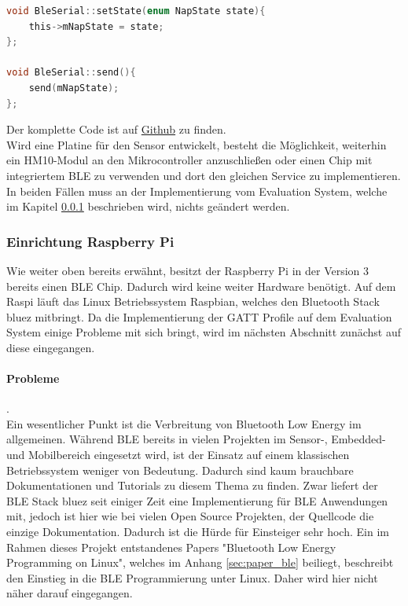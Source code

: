 \begin{lstlisting}[language=C, caption=send und setState Methoden aus der BleSerial bibliothek, label=lst:bleSerial_methods ]
void BleSerial::setState(enum NapState state){
	this->mNapState = state;
};

void BleSerial::send(){
	send(mNapState);
};
\end{lstlisting}

Der komplette Code ist auf \href{https://github.com/jomaway/poop-face-detection_sensor/tree/master/arduino/libraries/BleSerial}{Github}  zu finden. \\

Wird eine Platine für den Sensor entwickelt, besteht die Möglichkeit, weiterhin ein HM10-Modul an den Mikrocontroller anzuschließen oder einen Chip mit integriertem BLE zu verwenden und dort den gleichen Service zu implementieren. In beiden Fällen muss an der Implementierung vom Evaluation System, welche im Kapitel \ref{subsubsec:ble_raspi} beschrieben wird, nichts geändert werden.

\subsubsection{Einrichtung Raspberry Pi}
\label{subsubsec:ble_raspi}
Wie weiter oben bereits erwähnt, besitzt der Raspberry Pi in der Version 3 bereits einen BLE Chip. Dadurch wird keine weiter Hardware benötigt. Auf dem Raspi läuft das Linux Betriebssystem Raspbian, welches den Bluetooth Stack bluez mitbringt. Da die Implementierung der GATT Profile auf dem Evaluation System einige Probleme mit sich bringt, wird im nächsten Abschnitt zunächst auf diese eingegangen.

\paragraph{Probleme}. \\ 
Ein wesentlicher Punkt ist die Verbreitung von Bluetooth Low Energy im allgemeinen. Während BLE bereits in vielen Projekten im Sensor-, Embedded- und Mobilbereich eingesetzt wird, ist der Einsatz auf einem klassischen Betriebssystem weniger von Bedeutung. Dadurch sind kaum brauchbare Dokumentationen und Tutorials zu diesem Thema zu finden. Zwar liefert der BLE Stack bluez seit einiger Zeit eine Implementierung für BLE Anwendungen mit, jedoch ist hier wie bei vielen Open Source Projekten, der Quellcode die einzige Dokumentation. Dadurch ist die Hürde für Einsteiger sehr hoch. Ein im Rahmen dieses Projekt entstandenes Papers "Bluetooth Low Energy Programming on Linux", welches im Anhang \ref{sec:paper_ble} beiliegt, beschreibt den Einstieg in die BLE Programmierung unter Linux. Daher wird hier nicht näher darauf eingegangen. 

